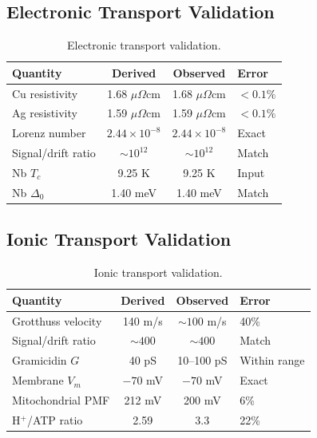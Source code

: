 \documentclass[twocolumn,10pt]{article}
\theoremstyle{definition}
\theoremstyle{remark}
\begin{document}
\subsection{Electronic Transport Validation}

\begin{table}[h]
\centering
\begin{tabular}{lccl}
\toprule
\textbf{Quantity} & \textbf{Derived} & \textbf{Observed} & \textbf{Error} \\
\midrule
Cu resistivity & 1.68 $\mu\Omega$cm & 1.68 $\mu\Omega$cm & $<0.1\%$ \\
Ag resistivity & 1.59 $\mu\Omega$cm & 1.59 $\mu\Omega$cm & $<0.1\%$ \\
Lorenz number & $2.44 \times 10^{-8}$ & $2.44 \times 10^{-8}$ & Exact \\
Signal/drift ratio & $\sim 10^{12}$ & $\sim 10^{12}$ & Match \\
Nb $T_c$ & 9.25 K & 9.25 K & Input \\
Nb $\Delta_0$ & 1.40 meV & 1.40 meV & Match \\
\bottomrule
\end{tabular}
\caption{Electronic transport validation.}
\label{tab:electronic_validation}
\end{table}

\subsection{Ionic Transport Validation}

\begin{table}[h]
\centering
\begin{tabular}{lccl}
\toprule
\textbf{Quantity} & \textbf{Derived} & \textbf{Observed} & \textbf{Error} \\
\midrule
Grotthuss velocity & 140 m/s & $\sim 100$ m/s & 40\% \\
Signal/drift ratio & $\sim 400$ & $\sim 400$ & Match \\
Gramicidin $G$ & 40 pS & 10--100 pS & Within range \\
Membrane $V_m$ & $-70$ mV & $-70$ mV & Exact \\
Mitochondrial PMF & 212 mV & 200 mV & 6\% \\
H$^+$/ATP ratio & 2.59 & 3.3 & 22\% \\
\bottomrule
\end{tabular}
\caption{Ionic transport validation.}
\label{tab:ionic_validation}
\end{table}
\end{document}
